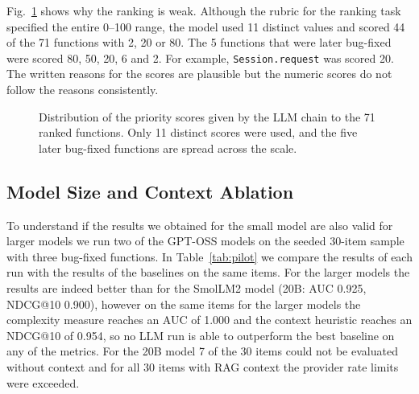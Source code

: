\documentclass[12pt,onecolumn,draftclsnofoot]{IEEEtran}
\begin{document}
Fig.~\ref{fig:scores} shows why the ranking is weak. Although the rubric for the ranking task specified the entire 0--100 range, the model used 11 distinct values and scored 44 of the 71 functions with 2, 20 or 80. The 5 functions that were later bug-fixed were scored 80, 50, 20, 6 and 2. For example, \texttt{Session.request} was scored 20. The written reasons for the scores are plausible but the numeric scores do not follow the reasons consistently.

\begin{figure}[!t]
\centering
{}
\caption{Distribution of the priority scores given by the LLM chain to the 71 ranked functions. Only 11 distinct scores were used, and the five later bug-fixed functions are spread across the scale.}
\label{fig:scores}
\end{figure}

\subsection{Model Size and Context Ablation}

To understand if the results we obtained for the small model are also valid for larger models we run two of the GPT-OSS models on the seeded 30-item sample with three bug-fixed functions. In Table~\ref{tab:pilot} we compare the results of each run with the results of the baselines on the same items. For the larger models the results are indeed better than for the SmolLM2 model (20B: AUC 0.925, NDCG@10 0.900), however on the same items for the larger models the complexity measure reaches an AUC of 1.000 and the context heuristic reaches an NDCG@10 of 0.954, so no LLM run is able to outperform the best baseline on any of the metrics. For the 20B model 7 of the 30 items could not be evaluated without context and for all 30 items with RAG context the provider rate limits were exceeded.
\end{document}
